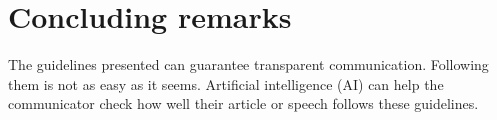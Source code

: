 \documentclass[%
reprint,
superscriptaddress,
nofootinbib,
 aps,
floatfix,
]{revtex4-2}
\begin{document}
\vspace{0.3\baselineskip}

\section{Concluding remarks}

The guidelines presented can guarantee transparent communication.
Following them is not as easy as it seems. 
Artificial intelligence (AI) can help the communicator check how well their article or speech follows these guidelines.




% 
\end{document}
